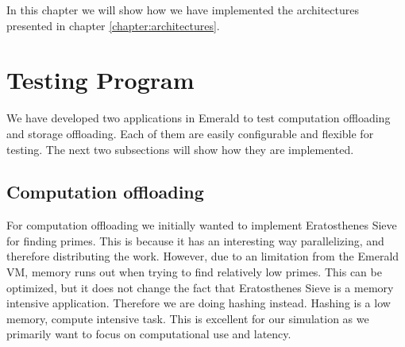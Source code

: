 In this chapter we will show how we have implemented the architectures presented in chapter \ref{chapter:architectures}.

\section{Testing Program}
We have developed two applications in Emerald to test computation offloading and storage offloading. Each of them are easily configurable and flexible for testing. The next two subsections will show how they are implemented.

\subsection{Computation offloading}
For computation offloading we initially wanted to implement Eratosthenes Sieve for finding primes. This is because it has an interesting way parallelizing, and therefore distributing the work. However, due to an limitation from the Emerald VM, memory runs out when trying to find relatively low primes. This can be optimized, but it does not change the fact that Eratosthenes Sieve is a memory intensive application. Therefore we are doing hashing instead. Hashing is a low memory, compute intensive task. This is excellent for our simulation as we primarily want to focus on computational use and latency.


